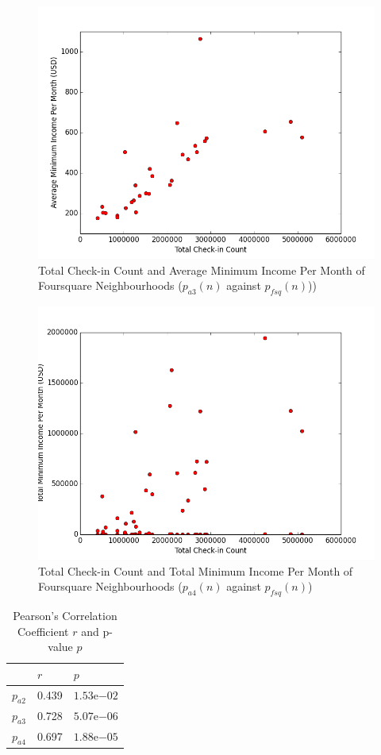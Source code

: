 \begin{figure}
\centering
\includegraphics[width=\columnwidth]{../checkin_avg_min_income.png}
\caption{Total Check-in Count and Average Minimum Income Per Month of Foursquare Neighbourhoods ($p_{a3}(n)$ against $p_{fsq}(n)$))} 
\label{fig:checkin_avg_min_income}
\end{figure}
\begin{figure}
\centering
\includegraphics[width=\columnwidth]{../checkin_ttl_min_income.png}
\caption{Total Check-in Count and Total Minimum Income Per Month of Foursquare Neighbourhoods ($p_{a4}(n)$ against $p_{fsq}(n)$)}
\label{fig:checkin_ttl_min_income}
\end{figure}
\begin{table}[]
\centering
\caption{Pearson's Correlation Coefficient $r$ and p-value $p$}
\label{tab:pop-corr}
\begin{tabular}{|l|l|l|}
\hline
         & $r$ & $p$ \\ \hline
$p_{a2}$ &  0.439 & $1.53\mathrm{e}{-02}$     \\ \hline
$p_{a3}$ &  0.728   & $5.07\mathrm{e}{-06}$  \\ \hline
$p_{a4}$ & 0.697 & $1.88\mathrm{e}{-05}$     \\ \hline
\end{tabular}
\end{table}
